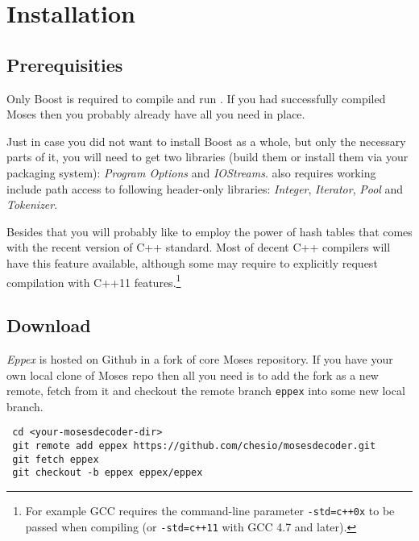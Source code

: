 \chapter{Installation}
\label{chap:installation}


\section*{Prerequisities}

Only Boost is required to compile and run \eppex{}.
If you had successfully compiled Moses then you probably already have all you need in place.

Just in case you did not want to install Boost as a whole, but only the necessary
parts of it, you will need to get two libraries (build them or install
them via your packaging system): \emph{Program Options} and \emph{IOStreams}.
\Eppex{} also requires working include path access to following
header-only libraries: \emph{Integer}, \emph{Iterator}, \emph{Pool} and \emph{Tokenizer}.

Besides that you will probably like to employ the power of hash tables
that comes with the recent version of C++ standard.
Most of decent C++ compilers will have this feature available,
although some may require to explicitly request compilation with C++11
features.\footnote{For example GCC requires the command-line parameter
\texttt{-std=c++0x} to be passed when compiling (or \texttt{-std=c++11}
with GCC 4.7 and later).}

\section*{Download}

\emph{Eppex} is hosted on Github in
a fork
of core Moses repository.
If you have your own local clone of Moses repo then all you need is to add
the fork as a new remote, fetch from it and checkout the remote branch
\texttt{eppex} into some new local branch.
\begin{verbatim}
 cd <your-mosesdecoder-dir>
 git remote add eppex https://github.com/chesio/mosesdecoder.git
 git fetch eppex
 git checkout -b eppex eppex/eppex
\end{verbatim}

